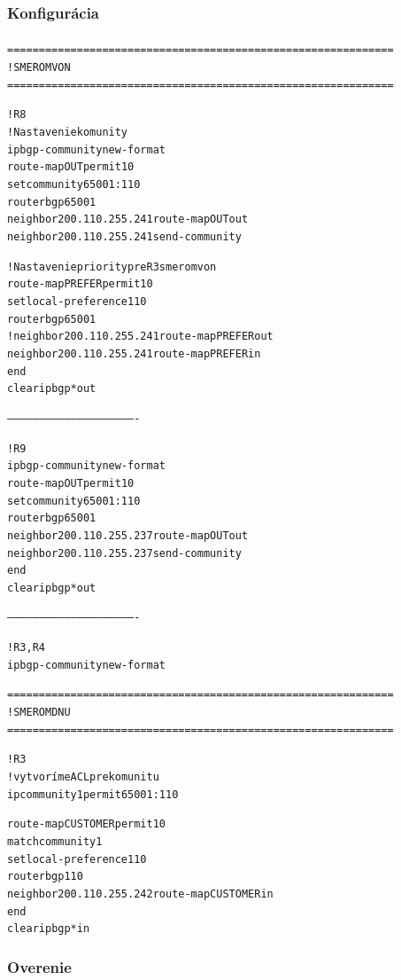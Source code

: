 \documentclass[12pt,twoside,a4paper]{report}
\begin{document}
\newpage

\subsubsection{Konfigurácia}
\paragraph{}

\noindent
{\selectfont
\begin{small}
\begin{alltt}
=============================================================
!SMEROM VON
=============================================================

!R8
!Nastavenie komunity
ip bgp-community new-format
route-map OUT permit 10
  set community 65001:110
router bgp 65001
  neighbor 200.110.255.241 route-map OUT out
  neighbor 200.110.255.241 send-community

!Nastavenie priority pre R3 smerom von
route-map PREFER permit 10
  set local-preference 110
router bgp 65001
  !neighbor 200.110.255.241 route-map PREFER out
  neighbor 200.110.255.241 route-map PREFER in
end
clear ip bgp * out



-------------------------------------------------------------


!R9
ip bgp-community new-format
route-map OUT permit 10
  set community 65001:110
router bgp 65001
  neighbor 200.110.255.237 route-map OUT out
  neighbor 200.110.255.237 send-community
end
clear ip bgp * out


-------------------------------------------------------------


!R3, R4
ip bgp-community new-format






=============================================================
!SMEROM DNU
=============================================================

!R3
!vytvoríme ACL pre komunitu
ip community 1 permit 65001:110

route-map CUSTOMER permit 10
  match community 1
  set local-preference 110
router bgp 110
  neighbor 200.110.255.242 route-map CUSTOMER in
end
clear ip bgp * in
\end{alltt}
\end{small}
}

\subsubsection{Overenie}
\end{document}
